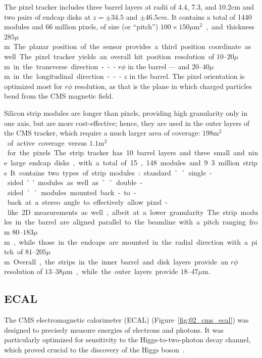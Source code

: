 The pixel tracker includes three barrel layers at radii of 4.4, 7.3, and 10.2\unit{cm} and two pairs of endcap disks at $z = \pm34.5$ and $\pm46.5\unit{cm}$.
It contains a total of 1440 modules and 66 million pixels, of size (or ``pitch'') $100\times150$\unit{$\mu$m$^2$}, and thickness $285$\unit{$\mu$m}.
The planar position of the sensor provides a third position coordinate as well.
The pixel tracker yields an overall hit position resolution of $10$--$20$\unit{$\mu$m} in the transverse direction --- $r\phi$ in the barrel ---  and $20$--$40$\unit{$\mu$m} in the longitudinal direction --- $z$ in the barrel.
The pixel orientation is optimized most for $r\phi$ resolution, as that is the plane in which charged particles bend from the CMS magnetic field.

Silicon strip modules are longer than pixels, providing high granularity only in one axis, but are more cost-effective; hence, they are used in the outer layers of the CMS tracker, which require a much larger area of coverage: $198$\unit{m$^2$} of active coverage versus $1.1$\unit{m$^2$} for the pixels.
The strip tracker has 10 barrel layers and three small and nine large endcap disks, with a total of 15,148 modules and 9.3 million strips.
It contains two types of strip modules: standard ``single-sided'' modules as well as ``double-sided`` modules mounted back-to-back at a stereo angle to effectively allow pixel-like 2D measurements as well, albeit at a lower granularity.

The strip modules in the barrel are aligned parallel to the beamline with a pitch ranging from $80$--$183$\unit{$\mu$m}, while those in the endcaps are mounted in the radial direction with a pitch of $81$--$205$\unit{$\mu$m}.
Overall, the strips in the inner barrel and disk layers provide an $r\phi$ resolution of $13$--$38$\unit{$\mu$m}, while the outer layers provide $18$--$47$\unit{$\mu$m}.


\subsection{ECAL}

The CMS electromagnetic calorimeter (ECAL) (Figure~\ref{fig:02_cms_ecal}) was designed to precisely measure energies of electrons and photons.
It was particularly optimized for sensitivity to the Higgs-to-two-photon decay channel, which proved crucial to the discovery of the Higgs boson~\cite{CMS:2012qbp}.


